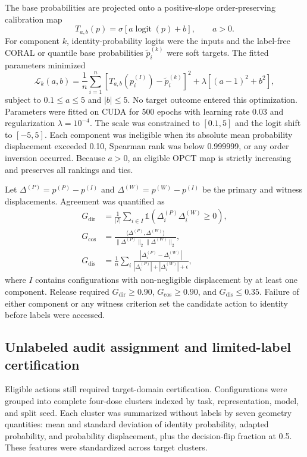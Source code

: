 \documentclass[preprint,12pt]{elsarticle}
\begin{document}
The base probabilities are projected onto a positive-slope order-preserving calibration map
\begin{equation}
T_{a,b}(p)=\sigma\left[a\operatorname{logit}(p)+b\right],\qquad a>0.
\end{equation}
For component $k$, identity-probability logits were the inputs and the label-free CORAL or quantile base probabilities $\widetilde p_i^{(k)}$ were soft targets. The fitted parameters minimized
\begin{equation}
\mathcal{L}_k(a,b)=\frac{1}{n}\sum_{i=1}^{n}\left[T_{a,b}(p_i^{(I)})-\widetilde p_i^{(k)}\right]^2+\lambda\left[(a-1)^2+b^2\right],
\end{equation}
subject to $0.1\leq a\leq5$ and $|b|\leq5$. No target outcome entered this optimization. Parameters were fitted on CUDA for 500 epochs with learning rate 0.03 and regularization $\lambda=10^{-4}$. The scale was constrained to $[0.1,5]$ and the logit shift to $[-5,5]$. Each component was ineligible when its absolute mean probability displacement exceeded 0.10, Spearman rank was below 0.999999, or any order inversion occurred. Because $a>0$, an eligible OPCT map is strictly increasing and preserves all rankings and ties.

Let $\Delta^{(P)}=p^{(P)}-p^{(I)}$ and $\Delta^{(W)}=p^{(W)}-p^{(I)}$ be the primary and witness displacements. Agreement was quantified as
\begin{align}
G_{\mathrm{dir}}&=\frac{1}{|I|}\sum_{i\in I}\mathbb{1}\left(\Delta_i^{(P)}\Delta_i^{(W)}\geq0\right),\\
G_{\cos}&=\frac{\langle\Delta^{(P)},\Delta^{(W)}\rangle}{\|\Delta^{(P)}\|_2\|\Delta^{(W)}\|_2},\\
G_{\mathrm{dis}}&=\frac{1}{n}\sum_i\frac{|\Delta_i^{(P)}-\Delta_i^{(W)}|}{|\Delta_i^{(P)}|+|\Delta_i^{(W)}|+\epsilon},
\end{align}
where $I$ contains configurations with non-negligible displacement by at least one component. Release required $G_{\mathrm{dir}}\geq0.90$, $G_{\cos}\geq0.90$, and $G_{\mathrm{dis}}\leq0.35$. Failure of either component or any witness criterion set the candidate action to identity before labels were accessed.

\subsection{Unlabeled audit assignment and limited-label certification}
\label{subsec:audit}

Eligible actions still required target-domain certification. Configurations were grouped into complete four-dose clusters indexed by task, representation, model, and split seed. Each cluster was summarized without labels by seven geometry quantities: mean and standard deviation of identity probability, adapted probability, and probability displacement, plus the decision-flip fraction at 0.5. These features were standardized across target clusters.
\end{document}
